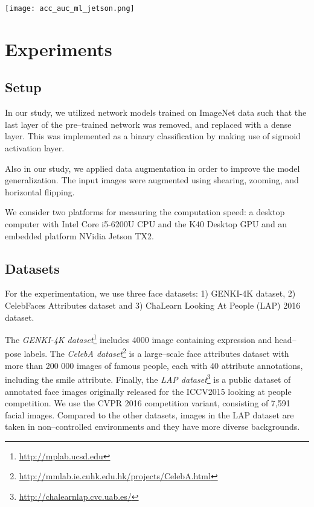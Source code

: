 \documentclass[conference]{IEEEtran}
\begin{document}
\begin{figure*}
\centering
\texttt{[image: acc\_auc\_ml\_jetson.png]}
\label{fig:accuracies}
\end{figure*}

\section{Experiments}

\subsection{Setup}

In our study, we utilized network models trained on ImageNet data such that the last layer of the pre--trained network was removed, and replaced with a dense layer. This was implemented as a binary classification by making use of sigmoid activation layer. %

Also in our study, we applied data augmentation in order to improve the  model generalization. The input images were augmented using shearing, zooming, and  horizontal flipping.

We consider two platforms for measuring the computation speed: a desktop computer with Intel Core i5-6200U CPU and the K40 Desktop GPU and an embedded platform NVidia Jetson TX2.

\subsection{Datasets}

For the experimentation, we use three face datasets: 1) GENKI-4K dataset, 2) CelebFaces Attributes dataset and 3) ChaLearn Looking At People (LAP) 2016 dataset.

The \textit{GENKI-4K dataset}\footnote{\url{http://mplab.ucsd.edu}} includes 4000 image containing expression and head--pose labels. The \textit{CelebA dataset}\footnote{\url{http://mmlab.ie.cuhk.edu.hk/projects/CelebA.html}} is a large--scale face attributes dataset with more than 200 000 images of famous people, each with 40 attribute annotations, including the smile attribute.
Finally, the \textit{LAP dataset}\footnote{\url{http://chalearnlap.cvc.uab.es/}} is a public dataset of annotated face images originally released for the ICCV2015 looking at people competition. We use the CVPR 2016 competition variant, consisting of 7,591 facial images. Compared to the other datasets, images in the LAP dataset are taken in non--controlled environments and they have more diverse backgrounds.
\end{document}
